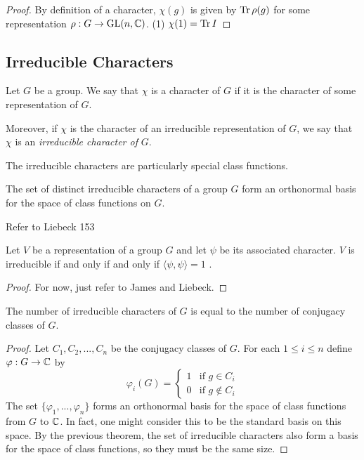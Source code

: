 \begin{proof}
    By definition of a character, $\chi(g)$ is given by $\text{Tr}\, \rho(g)$ for some representation $\rho : G \rightarrow 
    \operatorname{GL}(n, \mathbb{C})$.
    (1) $\chi(1) = \text{Tr}\, I$

\end{proof}




\subsection{Irreducible Characters}

\begin{definition}
    Let $G$ be a group. We say that $\chi$ is a character of $G$ if it is the character of some representation of 
    $G$.

    Moreover, if $\chi$ is the character of an irreducible representation of $G$, we say that $\chi$ is an
    \emph{irreducible character of} $G$.
\end{definition}

The irreducible characters are particularly special class functions.
\begin{theorem}
    The set of distinct irreducible characters of a group $G$ form an orthonormal basis for the space of class 
    functions on $G$.
\end{theorem}

Refer to Liebeck 153

\begin{theorem}
    Let $V$ be a representation of a group $G$ and let $\psi$ be its associated character.  $V$ is irreducible if 
    and only if and only if $\langle \psi, \psi \rangle = 1$ .
\end{theorem}

\begin{proof}
    For now, just refer to James and Liebeck.
\end{proof}



\begin{corollary}
    The number of irreducible characters of $G$ is equal to the number of conjugacy classes of $G$.
\end{corollary}
\begin{proof}
    Let $C_1, C_2, ..., C_n$ be the conjugacy classes of $G$. For each $1 \leq i \leq n$ define $\varphi : G 
    \rightarrow \mathbb{C}$ by
    \[
        \varphi_i(G) =
        \begin{cases}
            1 &\text{if } g \in C_i \\
            0 &\text{if } g \not\in C_i
        \end{cases}
    \]
    The set $\{\varphi_1, ..., \varphi_n \}$ forms an orthonormal basis for the space of class functions from $G$ 
    to $\mathbb{C}$. In fact, one might consider this to be the standard basis on this space. By the previous theorem, the 
    set of irreducible characters also form a basis for the space of class functions, so they must be the same 
    size.
\end{proof}

